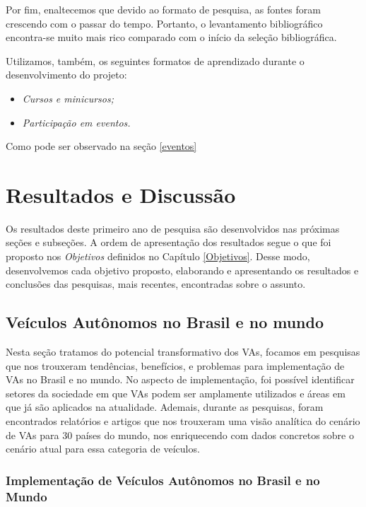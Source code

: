 Por fim, enaltecemos que devido ao formato de pesquisa, as fontes foram crescendo com o passar do tempo. Portanto, o levantamento bibliográfico encontra-se muito mais rico comparado com o início da seleção bibliográfica.


\vspace {0,5cm}

Utilizamos, também, os seguintes formatos de aprendizado durante o desenvolvimento do projeto:
\begin{itemize}
\item \textit{Cursos e minicursos;}
\item \textit{Participação em eventos.}
\end{itemize}
Como pode ser observado na seção \ref{eventos}
\newpage

\chapter{Resultados e Discussão} \label{resultados}

Os resultados deste primeiro ano de pesquisa são desenvolvidos nas próximas seções e subseções. A ordem de apresentação dos resultados segue o que foi proposto nos \textit{Objetivos} definidos no Capítulo \ref{Objetivos}. Desse modo, desenvolvemos cada objetivo proposto, elaborando e apresentando os resultados e conclusões das pesquisas, mais recentes, encontradas sobre o assunto.

\section{Veículos Autônomos no Brasil e no mundo}

Nesta seção tratamos do potencial transformativo dos VAs, focamos em pesquisas que nos trouxeram tendências, benefícios, e problemas para implementação de VAs no Brasil e no mundo. No aspecto de implementação, foi possível identificar setores da sociedade em que VAs podem ser amplamente utilizados e áreas em que já são aplicados na atualidade. Ademais, durante as pesquisas, foram encontrados relatórios e artigos que nos trouxeram uma visão analítica do cenário de VAs para 30 países do mundo, nos enriquecendo com dados concretos sobre o cenário atual para essa categoria de veículos. 

\subsection{Implementação de Veículos Autônomos no Brasil e no Mundo}

